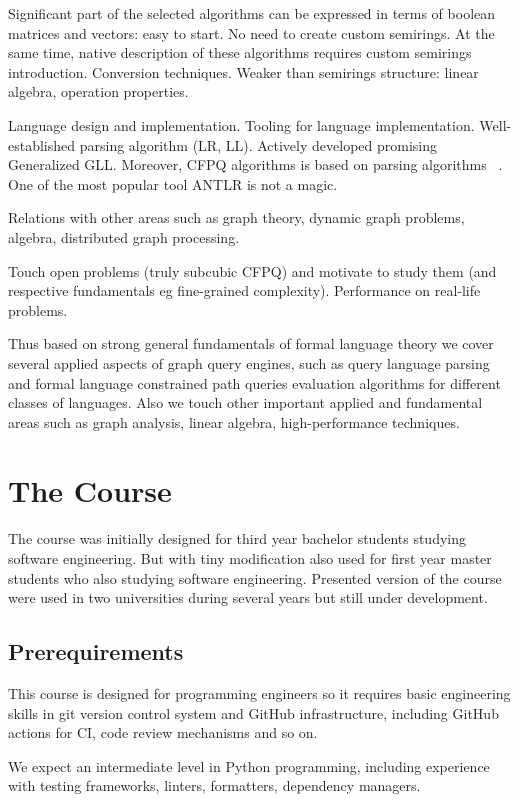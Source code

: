 \documentclass[sigconf]{acmart}
\begin{document}
Significant part of the selected algorithms can be expressed in terms of boolean matrices and vectors: easy to start.
No need to create custom semirings.
At the same time, native description of these algorithms requires custom semirings introduction.
Conversion techniques.
Weaker than semirings structure: linear algebra, operation properties. 

Language design and implementation. 
Tooling for language implementation.
Well-established parsing algorithm (LR, LL).
Actively developed promising Generalized GLL. 
Moreover, CFPQ algorithms is based on parsing algorithms ~\cite{!!!,!!!,!!!}.
One of the most popular tool ANTLR is not a magic. 

Relations with other areas such as graph theory, dynamic graph problems, algebra, distributed graph processing.

Touch open problems (truly subcubic CFPQ) and motivate to study them (and respective fundamentals eg fine-grained complexity).
Performance on real-life problems.

Thus based on strong general fundamentals of formal language theory we cover several applied aspects of graph query engines, such as query language parsing and formal language constrained path queries evaluation algorithms for different classes of languages.
Also we touch other important applied and fundamental areas such as graph analysis, linear algebra, high-performance techniques.

\section{The Course}

The course was initially designed for third year bachelor students studying software engineering.
But with tiny modification also used for first year master students who also studying software engineering.
Presented version of the course were used in two universities during several years but still under development.

\subsection{Prerequirements}

This course is designed for programming engineers so it requires basic engineering skills in git version control system and GitHub infrastructure, including GitHub actions for CI, code review mechanisms and so on.

We expect an intermediate level in Python programming, including experience with testing frameworks, linters, formatters, dependency managers. 
\end{document}
